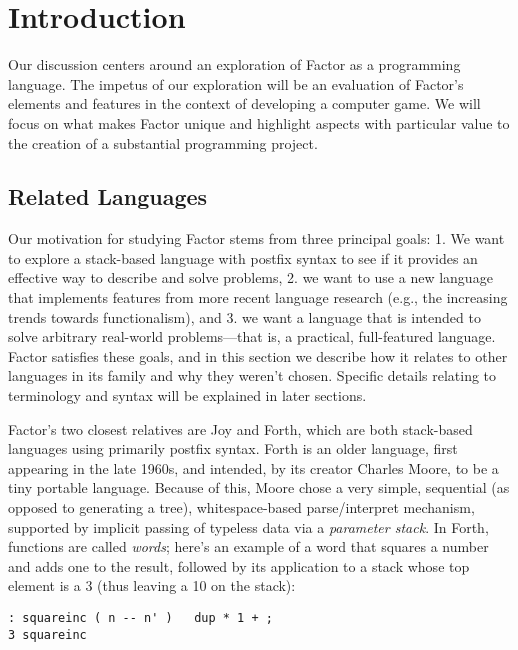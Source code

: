 \documentclass{sig-alternate}
\begin{document}



\section{Introduction}
Our discussion centers around an exploration of Factor as a programming language. 
The impetus of our exploration will be an evaluation of Factor's elements and features in the context of developing a computer game. We will focus on what makes Factor unique and highlight aspects with particular value to the creation of a substantial programming project.

\subsection{Related Languages}
Our motivation for studying Factor stems from three principal goals: 1. We want to explore a stack-based language with postfix syntax to see if it provides an effective way to describe and solve problems, 2. we want to use a new language that implements features from more recent language research (e.g., the increasing trends towards functionalism), and 3. we want a language that is intended to solve arbitrary real-world problems---that is, a practical, full-featured language. Factor satisfies these goals, and in this section we describe how it relates to other languages in its family and why they weren't chosen. Specific details relating to terminology and syntax will be explained in later sections.

Factor's two closest relatives are Joy\cite{Joy} and Forth\cite{ForthInc}, which are both stack-based languages using primarily postfix syntax. Forth is an older language, first appearing in the late 1960s, and intended, by its creator Charles Moore, to be a tiny portable language.\cite{ForthHistory} Because of this, Moore chose a very simple, sequential (as opposed to generating a tree), whitespace-based parse/interpret mechanism, supported by implicit passing of typeless data via a \textit{parameter stack}. In Forth, functions are called \textit{words}; here's an example of a word that squares a number and adds one to the result, followed by its application to a stack whose top element is a 3 (thus leaving a 10 on the stack):
\begin{verbatim}
: squareinc ( n -- n' )   dup * 1 + ;
3 squareinc
\end{verbatim}
\end{document}
